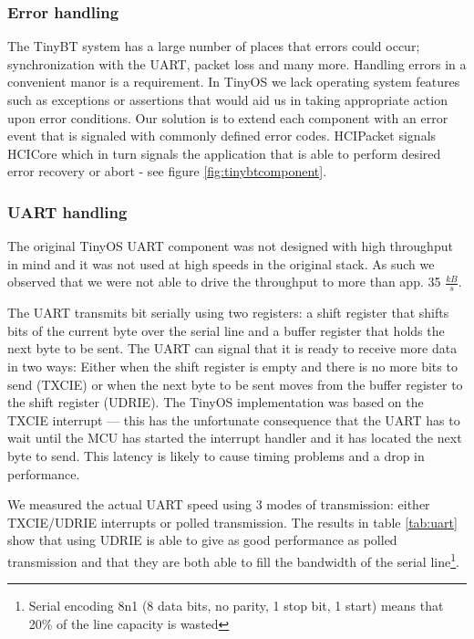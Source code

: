 \documentclass[a4paper,10pt]{article}
\begin{document}
\subsubsection{Error handling}
The TinyBT system has a large number of places that errors could
occur; synchronization with the UART, packet loss and many more.
Handling errors in a convenient manor is a requirement. In TinyOS we
lack operating system features such as exceptions or assertions that
would aid us in taking appropriate action upon error conditions. Our
solution is to extend each component with an error event that is
signaled with commonly defined error codes. HCIPacket signals HCICore
which in turn signals the application that is able to perform desired
error recovery or abort - see figure \ref{fig:tinybtcomponent}.

\subsubsection{UART handling}
The original TinyOS UART component was not designed with high
throughput in mind and it was not used at high speeds in the original
stack. As such we observed that we were not able to drive the
throughput to more than app. 35 $\frac{kB}{s}$.

The UART transmits bit serially using two registers: a shift register
that shifts bits of the current byte over the serial line and a buffer
register that holds the next byte to be sent. The UART can signal that
it is ready to receive more data in two ways: Either when the shift
register is empty and there is no more bits to send (TXCIE) or when
the next byte to be sent moves from the buffer register to the shift
register (UDRIE). The TinyOS implementation was based on the TXCIE
interrupt --- this has the unfortunate consequence that the UART has
to wait until the MCU has started the interrupt handler and it has
located the next byte to send. This latency is likely to cause timing
problems and a drop in performance.

We measured the actual UART speed using 3 modes of transmission:
either \mbox{TXCIE}/\mbox{UDRIE} interrupts or polled transmission. The
results in table \ref{tab:uart} show that using UDRIE is able to give
as good performance as polled transmission and that they are both able
to fill the bandwidth of the serial line\footnote{Serial encoding 8n1 (8
data bits, no parity, 1 stop bit, 1 start) means that 20\% of the line
capacity is wasted}.
\end{document}
